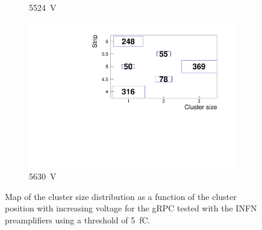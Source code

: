 \begin{figure}[H]
\begin{subfigure}{.33\linewidth}
			\caption{\label{fig:cluster-size-2D:E} \SI{5524}{V}}
		\end{subfigure}
		\begin{subfigure}{.33\linewidth}
		    \centering
			\includegraphics[width=1.1\linewidth]{fig/chapt6/Muon-ClS-5500-gRPC-INFN.pdf}
			\caption{\label{fig:cluster-size-2D:F} \SI{5630}{V}}
		\end{subfigure}
		\caption{\label{fig:cluster-size-2D} Map of the cluster size distribution as a function of the cluster position with increasing voltage for the gRPC tested with the INFN preamplifiers using a threshold of \SI{5}{fC}.}
	\end{figure}
	
\newpage
	

